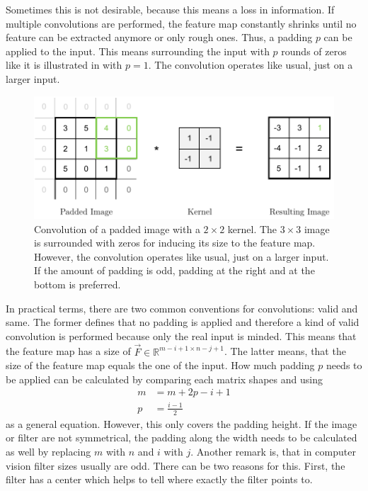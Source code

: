Sometimes this is not desirable, because this means a loss in information.
If multiple convolutions are performed, the feature map constantly shrinks until no feature can be extracted anymore or only rough ones.
Thus, a padding $p$ can be applied to the input.
This means surrounding the input with $p$ rounds of zeros like it is illustrated in  with $p=1$.
The convolution operates like usual, just on a larger input.
\begin{figure}
	\centering
	\includegraphics{images/convolution_padding.pdf}
	\caption[Convolution of a padded image with a kernel]{Convolution of a padded image with a $2 \times 2$ kernel. The $3 \times 3$ image is surrounded with zeros for inducing its size to the feature map. However, the convolution operates like usual, just on a larger input. If the amount of padding is odd, padding at the right and at the bottom is preferred.}
	\label{fig:convolution-padding}
\end{figure}
In practical terms, there are two common conventions for convolutions: valid and same.
The former defines that no padding is applied and therefore a kind of valid convolution is performed because only the real input is minded.
This means that the feature map has a size of $\vec{F} \in \mathbb{R}^{m-i+1 \times n-j+1}$.
The latter means, that the size of the feature map equals the one of the input.
How much padding $p$ needs to be applied can be calculated by comparing each matrix shapes and using
\begin{align}
	m &= m+2p-i+1 \\
	p &= \frac{i-1}{2}
\end{align}
as a general equation.
However, this only covers the padding height.
If the image or filter are not symmetrical, the padding along the width needs to be calculated as well by replacing $m$ with $n$ and $i$ with $j$.
Another remark is, that in computer vision filter sizes usually are odd.
There can be two reasons for this.
First, the filter has a center which helps to tell where exactly the filter points to.
